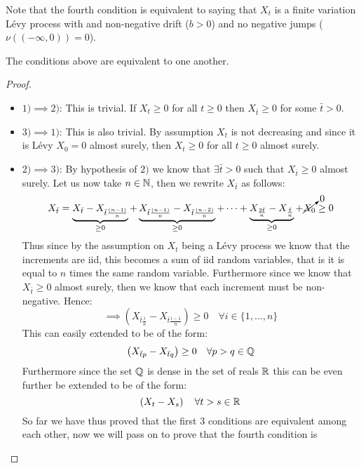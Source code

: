 \begin{remark*}
Note that the fourth condition is equivalent to saying that $X_t$ is a
finite variation L\'evy process with and non-negative drift ($b > 0$) and
no negative jumps ($\nu((-\infty, 0)) = 0$).
\end{remark*}

\begin{theorem}
The conditions above are equivalent to one another.    
\end{theorem}

\begin{proof}
$ $ \\
\begin{itemize}
    \item $1) \implies 2)$: This is trivial. If $X_t \geq 0$ for all $t \geq
    0$ then $X_{\bar{t}} \geq 0$ for some $\bar{t} > 0$.
    \item $3) \implies 1)$: This is also trivial. By assumption $X_t$ is not
    decreasing and since it is L\'evy $X_0=0$ almost surely, then $X_t \geq 0$
    for all $t \geq 0$ almost surely.
    \item $2) \implies 3)$: By hypothesis of $2)$ we know that
    $\exists\bar{t}>0$ such that $X_{\bar{t}} \geq 0$ almost surely. Let us now
    take $n\in\mathbb{N}$, then we rewrite $X_{\bar{t}}$ as follows:
    \[ X_{\bar{t}} = \underbrace{X_{\bar{t}} - X_{\bar{t}\frac{(n-1)}{n}}}_{
         \geq 0} + \underbrace{X_{\bar{t}\frac{(n-1)}{n}} - X_{\bar{t}
        \frac{(n-2)}{n}}}_{\geq 0} + \dots + \underbrace{X_{\frac{2\bar{t}}{n}}
        - X_{\frac{\bar{t}}{n}}}_{\geq 0} + \cancelto{0}{X_0} \geq 0 \]
    Thus since by the assumption on $X_t$ being a L\'evy process we know that 
    the increments are iid, this becomes a sum of iid random variables, that is
    it is equal to $n$ times the same random variable. Furthermore since we
    know that $X_{\bar{t}} \geq 0$ almost surely, then we know that each
    increment must be non-negative. Hence:
    \[ \implies \left( X_{\bar{t} \frac{i}{n}} - X_{\bar{t} \frac{i-1}{n}}
        \right) \geq 0 \quad \forall i \in \{1, \dots, n\} \]
    This can easily extended to be of the form:
    \[ \left( X_{\bar{t}p} - X_{\bar{t}q} \right) \geq 0 \quad \forall p > q
        \in \mathbb{Q} \]
    Furthermore since the set $\mathbb{Q}$ is dense in the set of reals $\mathbb{R}$ this can be
    even further be extended to be of the form:
    \[ \left( X_t - X_s \right) \quad \forall t > s \in \mathbb{R} \]
    So far we have thus proved that the first 3 conditions are equivalent among
    each other, now we will pass on to prove that the fourth condition is

\end{itemize}
\end{proof}

